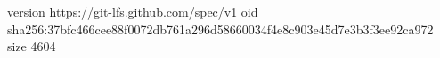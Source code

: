 version https://git-lfs.github.com/spec/v1
oid sha256:37bfc466cee88f0072db761a296d58660034f4e8c903e45d7e3b3f3ee92ca972
size 4604
